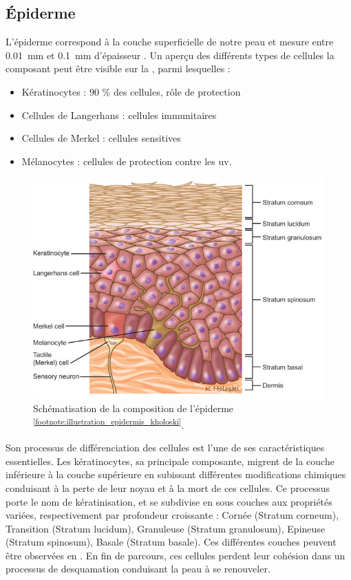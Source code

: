 \subsection{Épiderme}
L’épiderme correspond à la couche superficielle de notre peau et mesure entre \SI{0,01}{\milli\metre} et \SI{0,1}{\milli\metre} d’épaisseur \cite{Sandby-Moller2003}. Un aperçu des différents types de cellules la composant peut être visible sur la , parmi lesquelles :
\begin{itemize}
\item Kératinocytes : 90 \% des cellules, rôle de protection
\item Cellules de Langerhans : cellules immunitaires
\item Cellules de Merkel : cellules sensitives
\item Mélanocytes : cellules de protection contre les \gls{uv}.
\end{itemize}\par

 \begin{figure}[H]
    \centering
    \includegraphics[width=0.7\linewidth]{contents/chapter_1/resources/illustration_epidermis_kholoski.png}
    \caption{Schématisation de la composition de l’épiderme \textsuperscript{\ref{footnote:illustration_epidermis_kholoski}}.}
    \label{fig:illustration_epidermis_kholoski}
\end{figure}\par

\addtocounter{footnote}{1}

Son processus de différenciation des cellules est l’une de ses caractéristiques essentielles. Les kératinocytes, sa principale composante, migrent de la couche inférieure à la couche supérieure en subissant différentes modifications chimiques conduisant à la perte de leur noyau et à la mort de ces cellules. Ce processus porte le nom de kératinisation, et se subdivise en sous couches aux propriétés variées, respectivement par profondeur croissante : Cornée (Stratum corneum), Transition (Stratum lucidum), Granuleuse (Stratum granulosum), Epineuse (Stratum spinosum), Basale (Stratum basale). Ces différentes couches peuvent être observées en . En fin de parcours, ces cellules perdent leur cohésion dans un processus de desquamation conduisant la peau à se renouveler.\par\clearpage

